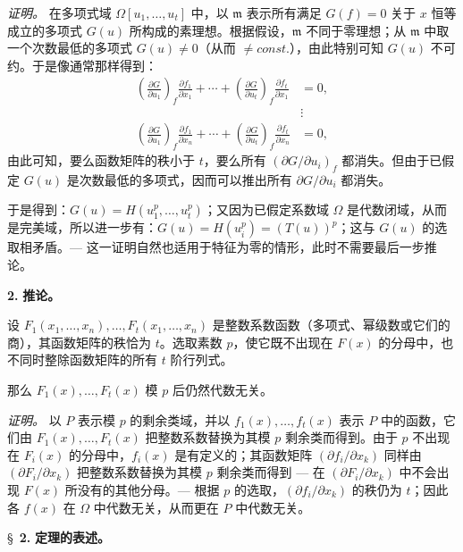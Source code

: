 \noindent\textit{证明。}
在多项式域 $\Omega[u_1,\ldots,u_t]$ 中，以 $\mathfrak{m}$ 表示所有满足 $G(f) = 0$ 关于 $x$ 恒等成立的多项式 $G(u)$ 所构成的素理想。根据假设，$\mathfrak{m}$ 不同于零理想；从 $\mathfrak{m}$ 中取一个次数最低的多项式 $G(u) \neq 0$（从而 $\neq {const.}$），由此特别可知 $G(u)$ 不可约。于是像通常那样得到：
\[
\begin{aligned}
\left(\frac{\partial G}{\partial u_1}\right)_{f}\frac{\partial f_1}{\partial x_1}
 +\cdots+
\left(\frac{\partial G}{\partial u_t}\right)_{f}\frac{\partial f_t}{\partial x_1}&=0,\\[-1mm]
&\vdots\\[-1mm]
\left(\frac{\partial G}{\partial u_1}\right)_{f}\frac{\partial f_1}{\partial x_n}
 +\cdots+
\left(\frac{\partial G}{\partial u_t}\right)_{f}\frac{\partial f_t}{\partial x_n}&=0,
\end{aligned}
\]
由此可知，要么函数矩阵的秩小于 $t$，要么所有 $\left(\partial G/\partial u_i\right)_{f}$ 都消失。但由于已假定 $G(u)$ 是次数最低的多项式，因而可以推出所有 $\partial G/\partial u_i$ 都消失。

于是得到：$G(u)=H(u_1^p,\ldots,u_t^p)$；又因为已假定系数域 $\Omega$ 是代数闭域，从而是完美域，所以进一步有：$G(u)=H(u_i^p)=(T(u))^p$；这与 $G(u)$ 的选取相矛盾。--- 这一证明自然也适用于特征为零的情形，此时不需要最后一步推论。

\medskip\noindent\textbf{2.} \textbf{推论。}

设 $F_1(x_1,\ldots,x_n),\ldots,F_t(x_1,\ldots,x_n)$ 是整数系数函数（多项式、幂级数或它们的商），其函数矩阵的秩恰为 $t$。选取素数 $p$，使它既不出现在 $F(x)$ 的分母中，也不同时整除函数矩阵的所有 $t$ 阶行列式。

那么 $F_1(x),\ldots,F_t(x)$ 模 $p$ 后仍然代数无关。

\noindent\textit{证明。}
以 $P$ 表示模 $p$ 的剩余类域，并以 $f_1(x),\ldots,f_t(x)$ 表示 $P$ 中的函数，它们由 $F_1(x),\ldots,F_t(x)$ 把整数系数替换为其模 $p$ 剩余类而得到。由于 $p$ 不出现在 $F_i(x)$ 的分母中，$f_i(x)$ 是有定义的；其函数矩阵 $(\partial f_i/\partial x_k)$ 同样由 $(\partial F_i/\partial x_k)$ 把整数系数替换为其模 $p$ 剩余类而得到 --- 在 $(\partial F_i/\partial x_k)$ 中不会出现 $F(x)$ 所没有的其他分母。--- 根据 $p$ 的选取，$(\partial f_i/\partial x_k)$ 的秩仍为 $t$；因此各 $f(x)$ 在 $\Omega$ 中代数无关，从而更在 $P$ 中代数无关。

\bigskip
\S~\textbf{2.}
\textbf{定理的表述。}

\smallskip

